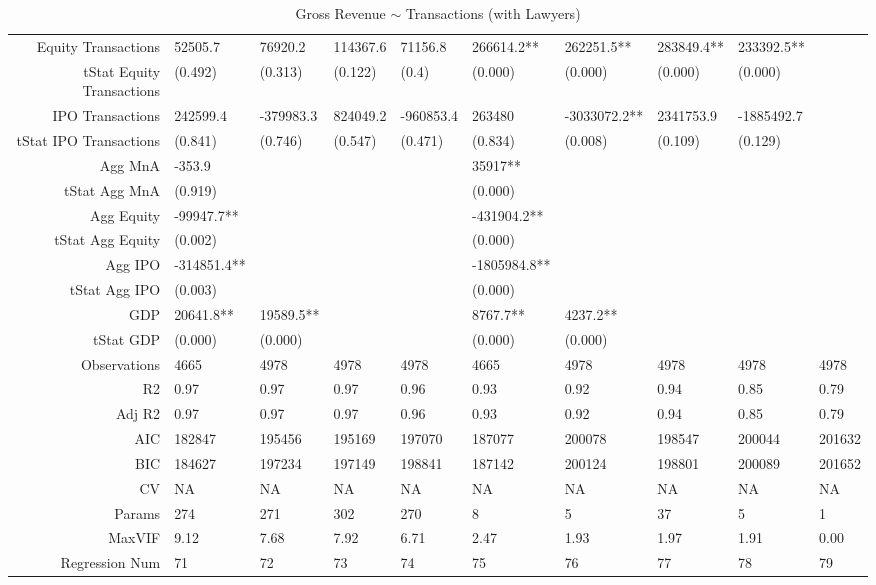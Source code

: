 \begin{table}[ht]
\begin{tabular}{rlllllllll}
  Equity Transactions & 52505.7 & 76920.2 & 114367.6 & 71156.8 & 266614.2** & 262251.5** & 283849.4** & 233392.5** &  \\ 
  tStat Equity Transactions & (0.492) & (0.313) & (0.122) & (0.4) & (0.000) & (0.000) & (0.000) & (0.000) &  \\ 
  IPO Transactions & 242599.4 & -379983.3 & 824049.2 & -960853.4 & 263480 & -3033072.2** & 2341753.9 & -1885492.7 &  \\ 
  tStat IPO Transactions & (0.841) & (0.746) & (0.547) & (0.471) & (0.834) & (0.008) & (0.109) & (0.129) &  \\ 
  Agg MnA & -353.9 &  &  &  & 35917** &  &  &  &  \\ 
  tStat Agg MnA & (0.919) &  &  &  & (0.000) &  &  &  &  \\ 
  Agg Equity & -99947.7** &  &  &  & -431904.2** &  &  &  &  \\ 
  tStat Agg Equity & (0.002) &  &  &  & (0.000) &  &  &  &  \\ 
  Agg IPO & -314851.4** &  &  &  & -1805984.8** &  &  &  &  \\ 
  tStat Agg IPO & (0.003) &  &  &  & (0.000) &  &  &  &  \\ 
  GDP & 20641.8** & 19589.5** &  &  & 8767.7** & 4237.2** &  &  &  \\ 
  tStat GDP & (0.000) & (0.000) &  &  & (0.000) & (0.000) &  &  &  \\ 
  Observations & 4665 & 4978 & 4978 & 4978 & 4665 & 4978 & 4978 & 4978 & 4978 \\ 
  R2 & 0.97 & 0.97 & 0.97 & 0.96 & 0.93 & 0.92 & 0.94 & 0.85 & 0.79 \\ 
  Adj R2 & 0.97 & 0.97 & 0.97 & 0.96 & 0.93 & 0.92 & 0.94 & 0.85 & 0.79 \\ 
  AIC & 182847 & 195456 & 195169 & 197070 & 187077 & 200078 & 198547 & 200044 & 201632 \\ 
  BIC & 184627 & 197234 & 197149 & 198841 & 187142 & 200124 & 198801 & 200089 & 201652 \\ 
  CV & NA & NA & NA & NA & NA & NA & NA & NA & NA \\ 
  Params & 274 & 271 & 302 & 270 & 8 & 5 & 37 & 5 & 1 \\ 
  MaxVIF & 9.12 & 7.68 & 7.92 & 6.71 & 2.47 & 1.93 & 1.97 & 1.91 & 0.00 \\ 
  Regression Num & 71 & 72 & 73 & 74 & 75 & 76 & 77 & 78 & 79 \\ 
   \hline
\end{tabular}
\caption{Gross Revenue $\sim$ Transactions (with Lawyers)} 
\end{table}
